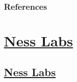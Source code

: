 \documentclass[oneside]{book}
\numberwithin{equation}{section}
\begin{document}
\subsection{References}





\chapter{\href{https://nesslabs.com/}{Ness Labs}}

\section{\href{https://nesslabs.com/}{Ness Labs}}
\end{document}
